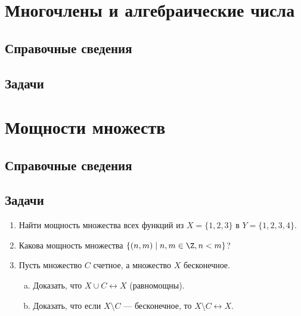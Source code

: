 \section{Многочлены и алгебраические числа}

\subsection*{Справочные сведения}

\subsection*{Задачи}




\begin{comment}
\chapter{15. Континуум}
\end{comment}


\section{Мощности множеств}\label{powers}

\subsection*{Справочные сведения}

\subsection*{Задачи}

\begin{enumerate}
\item Найти мощность множества всех функций из $X=\{1,2,3\}$ в $Y=\{1,2,3,4\}$.
\item Какова мощность множества $\{(n,m)\mid n,m\in\Z, n<m\}$?
\item Пусть множество $C$ счетное, а множество $X$ бесконечное.
\begin{enumerate}[a)]
\item Доказать, что $X\cup C\leftrightarrow X$ (равномощны).
\item Доказать, что если $X\setminus C$ --- бесконечное, то $X\setminus C\leftrightarrow X$.
\end{enumerate}
\end{enumerate}

